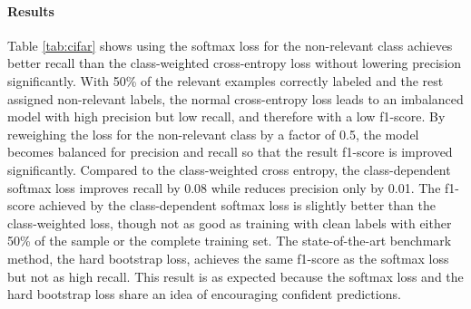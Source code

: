 
\paragraph{Results}

Table \ref{tab:cifar} shows using the softmax loss for the non-relevant class achieves better recall than the class-weighted cross-entropy loss without lowering precision significantly.
With 50\% of the relevant examples correctly labeled and the rest assigned non-relevant labels, the normal cross-entropy loss leads to an imbalanced model with high precision but low recall, and therefore with a low f1-score.
By reweighing the loss for the non-relevant class by a factor of 0.5, the model becomes balanced for precision and recall so that the result f1-score is improved significantly.
Compared to the class-weighted cross entropy, the class-dependent softmax loss improves recall by 0.08 while reduces precision only by 0.01.
The f1-score achieved by the class-dependent softmax loss is slightly better than the class-weighted loss, though not as good as training with clean labels with either 50\% of the sample or the complete training set.
The state-of-the-art benchmark method, the hard bootstrap loss, achieves the same f1-score as the softmax loss but not as high recall.
This result is as expected because the softmax loss and the hard bootstrap loss share an idea of encouraging confident predictions.



